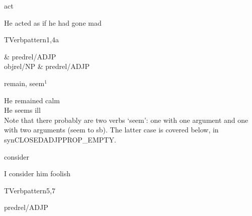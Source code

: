 
\begin{thetadescr}
\evitem  act
\esitem
     \begin{examples}
        \example He acted as if he had gone mad
     \end{examples}
\end{thetadescr}


\newpage
\verbpattern{[synCLOSEDADJPPROP] }
\begin{vpattern}
 TVerbpattern1,4a
\csritem \mbox{}\\
     \begin{csr}
                & predrel/ADJP\\
      objrel/NP & predrel/ADJP 
     \end{csr}
\remarksitem
  
\end{vpattern}


\begin{thetadescr}
\evitem  remain, seem$^{1}$
\esitem
     \begin{examples}
        \example He remained calm\\
        \example He seems ill\\
                 Note that there probably are two verbs `seem': one with one 
                 argument
                 and one with two arguments (seem to sb). The latter case is 
                 covered below, in synCLOSEDADJPPROP\_EMPTY.
     \end{examples}
\end{thetadescr}



\begin{thetadescr}
\evitem  consider
\esitem
     \begin{examples}
        \example I consider him foolish
     \end{examples}
\end{thetadescr}


\newpage
{}
\begin{vpattern}
 TVerbpattern5,7
\csritem \mbox{}\\
     \begin{csr}
      predrel/ADJP
     \end{csr}
\remarksitem
  
\end{vpattern}

